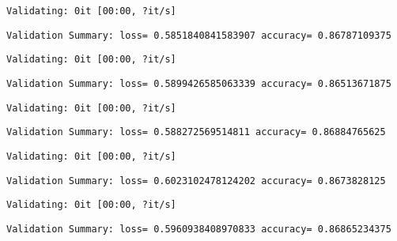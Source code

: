 \documentclass[11pt]{article}
\begin{document}
    
    \begin{Verbatim}[commandchars=\\\{\}]
Validating: 0it [00:00, ?it/s]
    \end{Verbatim}

    
    \begin{Verbatim}[commandchars=\\\{\}]
Validation Summary: loss= 0.5851840841583907 accuracy= 0.86787109375
    \end{Verbatim}

    
    \begin{Verbatim}[commandchars=\\\{\}]
Validating: 0it [00:00, ?it/s]
    \end{Verbatim}

    
    \begin{Verbatim}[commandchars=\\\{\}]
Validation Summary: loss= 0.5899426585063339 accuracy= 0.86513671875
    \end{Verbatim}

    
    \begin{Verbatim}[commandchars=\\\{\}]
Validating: 0it [00:00, ?it/s]
    \end{Verbatim}

    
    \begin{Verbatim}[commandchars=\\\{\}]
Validation Summary: loss= 0.588272569514811 accuracy= 0.86884765625
    \end{Verbatim}

    
    \begin{Verbatim}[commandchars=\\\{\}]
Validating: 0it [00:00, ?it/s]
    \end{Verbatim}

    
    \begin{Verbatim}[commandchars=\\\{\}]
Validation Summary: loss= 0.6023102478124202 accuracy= 0.8673828125
    \end{Verbatim}

    
    \begin{Verbatim}[commandchars=\\\{\}]
Validating: 0it [00:00, ?it/s]
    \end{Verbatim}

    
    \begin{Verbatim}[commandchars=\\\{\}]
Validation Summary: loss= 0.5960938408970833 accuracy= 0.86865234375
    \end{Verbatim}
\end{document}
